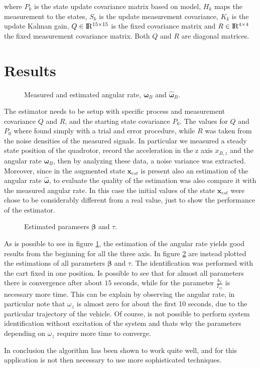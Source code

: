\noindent where $P_k$ is the state update covariance matrix based on model, $H_k$ maps the measurement to the states, $S_k$ is the update measurement covariance, $K_k$ is the update Kalman gain, $Q\in\rm I\!R^{15\times 15}$ is the fixed covariance matrix and $R\in\rm I\!R^{4\times 4}$ the fixed measurement covariance matrix. Both $Q$ and $R$ are diagonal matrices.


\section{Results}
\label{resultsKalman}

\begin{figure}[h]
	\centering
 	
 	\caption{Measured and estimated angular rate, $\boldsymbol{\omega}_B$ and $\hat{\boldsymbol{\omega}}_B$.}
 	\label{fig:omegaKalman}		
\end{figure}

\noindent The estimator needs to be setup with specific process and measurement covariance $Q$ and $R$, and the starting state covariance $P_0$. The values for $Q$ and $P_0$ where found simply with a trial and error procedure, while $R$ was taken from the noise densities of the measured signals. In particular we measured a steady state position of the quadrotor, record the acceleration in the z axis $\ddot{x}_{B,z}$ and the angular rate $\boldsymbol{\omega}_B$, then by analyzing these data, a noise variance was extracted. Moreover, since in the augmented state $\mathbf{x}_{est}$ is present also an estimation of the angular rate $\hat{\boldsymbol{\omega}}$, to evaluate the quality of the estimation was also compare it with the measured angular rate. In this case the initial values of the state $\mathbf{x}_{est}$ were chose to be considerably different from a real value, just to show the performance of the estimator.

\begin{figure}[h]
	\centering
	
	
	\caption{Estimated parameers $\boldsymbol{\beta}$ and $\tau$.}
	\label{fig:betaTauKalman}
\end{figure}

\noindent As is possible to see in figure \ref{fig:omegaKalman}, the estimation of the angular rate yields good results from the beginning for all the three axis. In figure \ref{fig:betaTauKalman} are instead plotted the estimations of all parameters $\boldsymbol{\beta}$ and $\tau$. The identification was performed with the cart fixed in one position. Is possible to see that for almost all parameters there is convergence after about $15$ seconds, while for the parameter $\frac{b_f}{I_{zz}}$ is necessary more time. This can be explain by observing the angular rate, in particular note that $\omega_z$ is almost zero for about the first 10 seconds, due to the particular trajectory of the vehicle. Of course, is not possible to perform system identification without excitation of the system and thats why the parameters depending on $\omega_z$ require more time to converge.

\noindent In conclusion the algorithm has been shown to work quite well, and for this application is not then necessary to use more sophisticated techniques.
